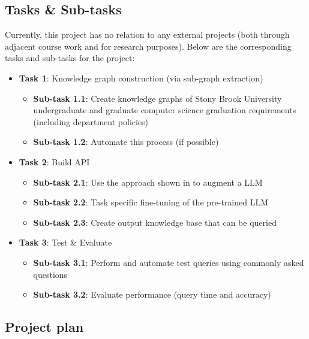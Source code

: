 \documentclass[12pt]{article}
\begin{document}
    \subsection{Tasks \& Sub-tasks}
    \label{subsec:tasks}
    Currently, this project has no relation to any external projects (both through adjacent course work and for research purposes). Below are the corresponding tasks and sub-tasks for the project:

    \begin{itemize}
        \item \textbf{Task 1}: Knowledge graph construction (via sub-graph extraction\cite{He-WSDM-2021})
        \begin{itemize}
            \item \textbf{Sub-task 1.1}: Create knowledge graphs of Stony Brook University undergraduate and graduate computer science graduation requirements (including department policies)
            \item \textbf{Sub-task 1.2}: Automate this process (if possible)
        \end{itemize}
        \item \textbf{Task 2}: Build API
        \begin{itemize}
            \item \textbf{Sub-task 2.1}: Use the approach shown in \cite{luo2024} to augment a LLM \cite{alpaca,touvron2023llama,touvron2023llama2,ye2023gpt3.5}
            \item \textbf{Sub-task 2.2}: Task specific fine-tuning of the pre-trained LLM
            \item \textbf{Sub-task 2.3}: Create output knowledge base that can be queried
        \end{itemize}
        \item \textbf{Task 3}: Test \& Evaluate
        \begin{itemize}
            \item \textbf{Sub-task 3.1}: Perform and automate test queries using commonly asked questions
            \item \textbf{Sub-task 3.2}: Evaluate performance (query time and accuracy)
        \end{itemize}
    \end{itemize}

    \subsection{Project plan} 
    \label{subsec:plan}
    
\end{document}
